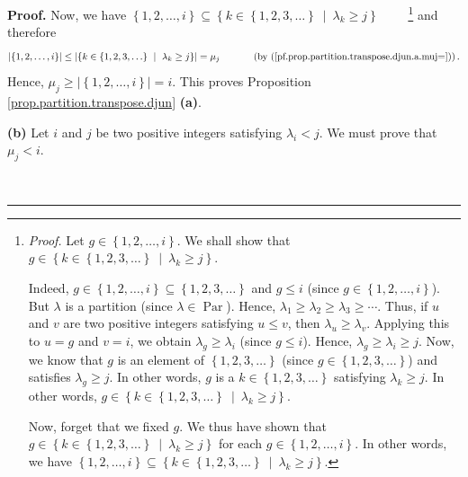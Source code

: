 \documentclass[numbers=enddot,12pt,final,onecolumn,notitlepage]{scrartcl}%
\theoremstyle{definition}
\newenvironment{proof}[1][Proof]{\noindent\textbf{#1.} }{\ \rule{0.5em}{0.5em}}
\newenvironment{verlong}{}{}
\begin{document}
\begin{verlong}
\begin{proof}
Now, we have $\left\{  1,2,\ldots,i\right\}  \subseteq\left\{  k\in\left\{
1,2,3,\ldots\right\}  \ \mid\ \lambda_{k}\geq j\right\}  $%
\ \ \ \ \footnote{\textit{Proof.} Let $g\in\left\{  1,2,\ldots,i\right\}  $.
We shall show that $g\in\left\{  k\in\left\{  1,2,3,\ldots\right\}
\ \mid\ \lambda_{k}\geq j\right\}  $.
\par
Indeed, $g\in\left\{  1,2,\ldots,i\right\}  \subseteq\left\{  1,2,3,\ldots
\right\}  $ and $g\leq i$ (since $g\in\left\{  1,2,\ldots,i\right\}  $). But
$\lambda$ is a partition (since $\lambda\in\operatorname*{Par}$). Hence,
$\lambda_{1}\geq\lambda_{2}\geq\lambda_{3}\geq\cdots$. Thus, if $u$ and $v$
are two positive integers satisfying $u\leq v$, then $\lambda_{u}\geq
\lambda_{v}$. Applying this to $u=g$ and $v=i$, we obtain $\lambda_{g}%
\geq\lambda_{i}$ (since $g\leq i$). Hence, $\lambda_{g}\geq\lambda_{i}\geq j$.
Now, we know that $g$ is an element of $\left\{  1,2,3,\ldots\right\}  $
(since $g\in\left\{  1,2,3,\ldots\right\}  $) and satisfies $\lambda_{g}\geq
j$. In other words, $g$ is a $k\in\left\{  1,2,3,\ldots\right\}  $ satisfying
$\lambda_{k}\geq j$. In other words, $g\in\left\{  k\in\left\{  1,2,3,\ldots
\right\}  \ \mid\ \lambda_{k}\geq j\right\}  $.
\par
Now, forget that we fixed $g$. We thus have shown that $g\in\left\{
k\in\left\{  1,2,3,\ldots\right\}  \ \mid\ \lambda_{k}\geq j\right\}  $ for
each $g\in\left\{  1,2,\ldots,i\right\}  $. In other words, we have $\left\{
1,2,\ldots,i\right\}  \subseteq\left\{  k\in\left\{  1,2,3,\ldots\right\}
\ \mid\ \lambda_{k}\geq j\right\}  $.} and therefore%
\[
\left\vert \left\{  1,2,\ldots,i\right\}  \right\vert \leq\left\vert \left\{
k\in\left\{  1,2,3,\ldots\right\}  \ \mid\ \lambda_{k}\geq j\right\}
\right\vert =\mu_{j}\ \ \ \ \ \ \ \ \ \ \left(  \text{by
(\ref{pf.prop.partition.transpose.djun.a.muj=})}\right)  .
\]
Hence, $\mu_{j}\geq\left\vert \left\{  1,2,\ldots,i\right\}  \right\vert =i$.
This proves Proposition \ref{prop.partition.transpose.djun} \textbf{(a)}.

\textbf{(b)} Let $i$ and $j$ be two positive integers satisfying $\lambda
_{i}<j$. We must prove that $\mu_{j}<i$.


\end{proof}
\end{verlong}
\end{document}
